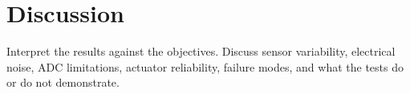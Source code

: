 \chapter{Discussion}
\label{chap:discussion}

Interpret the results against the objectives. Discuss sensor variability,
electrical noise, ADC limitations, actuator reliability, failure modes, and
what the tests do or do not demonstrate.
